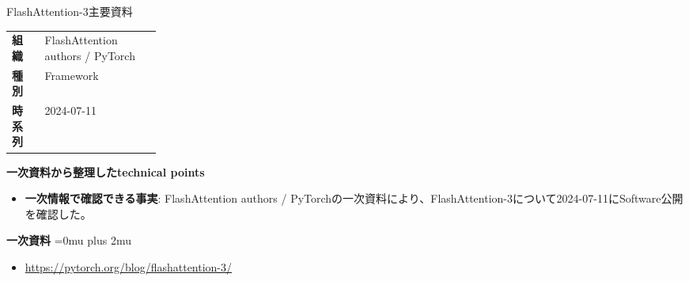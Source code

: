 \begin{technicalnote}{FlashAttention-3}{主要資料}
\begingroup
\begin{tabularx}{\linewidth}{@{}>{\bfseries}p{0.22\linewidth}X@{}}
組織 & FlashAttention authors / PyTorch \\
種別 & Framework \\
時系列 & 2024-07-11 \\
\end{tabularx}
\smallskip
{\bfseries 一次資料から整理したtechnical points}
\begin{itemize}[leftmargin=1.5em,itemsep=0.35em]
\item \textbf{一次情報で確認できる事実}: FlashAttention authors / PyTorchの一次資料により、FlashAttention-3について2024-07-11にSoftware公開を確認した。
\end{itemize}
\begin{minipage}{\linewidth}
\begin{samepage}
{\bfseries 一次資料}
\begingroup\sloppy
\Urlmuskip=0mu plus 2mu\relax
\begin{itemize}[leftmargin=1.5em,itemsep=0.25em]
\item {\scriptsize\url{https://pytorch.org/blog/flashattention-3/}}
\end{itemize}
\endgroup
\end{samepage}
\end{minipage}
\endgroup
\end{technicalnote}
\medskip

